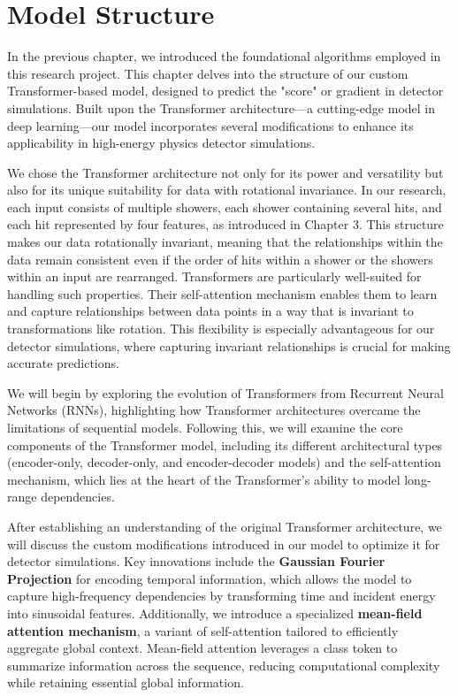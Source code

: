 \chapter{Model Structure}

In the previous chapter, we introduced the foundational algorithms employed in this research project. This chapter delves into the structure of our custom Transformer-based model, designed to predict the "score" or gradient in detector simulations. Built upon the Transformer architecture—a cutting-edge model in deep learning—our model incorporates several modifications to enhance its applicability in high-energy physics detector simulations.

We chose the Transformer architecture not only for its power and versatility but also for its unique suitability for data with rotational invariance. In our research, each input consists of multiple showers, each shower containing several hits, and each hit represented by four features, as introduced in Chapter 3. This structure makes our data rotationally invariant, meaning that the relationships within the data remain consistent even if the order of hits within a shower or the showers within an input are rearranged. Transformers are particularly well-suited for handling such properties. Their self-attention mechanism enables them to learn and capture relationships between data points in a way that is invariant to transformations like rotation. This flexibility is especially advantageous for our detector simulations, where capturing invariant relationships is crucial for making accurate predictions.

We will begin by exploring the evolution of Transformers from Recurrent Neural Networks (RNNs), highlighting how Transformer architectures overcame the limitations of sequential models. Following this, we will examine the core components of the Transformer model, including its different architectural types (encoder-only, decoder-only, and encoder-decoder models) and the self-attention mechanism, which lies at the heart of the Transformer’s ability to model long-range dependencies.

After establishing an understanding of the original Transformer architecture, we will discuss the custom modifications introduced in our model to optimize it for detector simulations. Key innovations include the \textbf{Gaussian Fourier Projection} for encoding temporal information, which allows the model to capture high-frequency dependencies by transforming time and incident energy into sinusoidal features. Additionally, we introduce a specialized \textbf{mean-field attention mechanism}, a variant of self-attention tailored to efficiently aggregate global context. Mean-field attention leverages a class token to summarize information across the sequence, reducing computational complexity while retaining essential global information.

